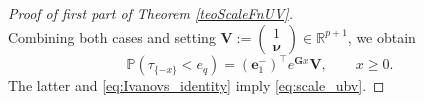 \documentclass[10pt,a4paper]{amsart}
\newcommand{\PP}{\mathbb{P}}
\begin{document}
\begin{proof}[Proof of first part of Theorem \ref{teoScaleFnUV}]
\[\]
Combining both cases and setting $\bm{V}:=\begin{pmatrix}1\\\bm{\nu}\end{pmatrix}\in\mathbb{R}^{p+1}$, we obtain
\begin{equation}\label{eq:hitting_ubv}
\PP(\tau_{\{-x\}} < e_q) = (\bm{e}_1^-)^\intercal e^{\bm{G}x}\bm{V}, \qquad x \ge 0.
\end{equation}
The latter and \eqref{eq:Ivanovs_identity} imply \eqref{eq:scale_ubv}.
\end{proof}
\end{document}
